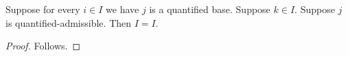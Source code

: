 

\begin{theorem}\label{quantified_unanchored_result}
    Suppose for every $i\in I$ we have $j$ is a quantified base.
    Suppose $k\in I$.
    Suppose $j$ is quantified-admissible.
    Then $I=I$.
\end{theorem}
\begin{proof}
    Follows.
\end{proof}
